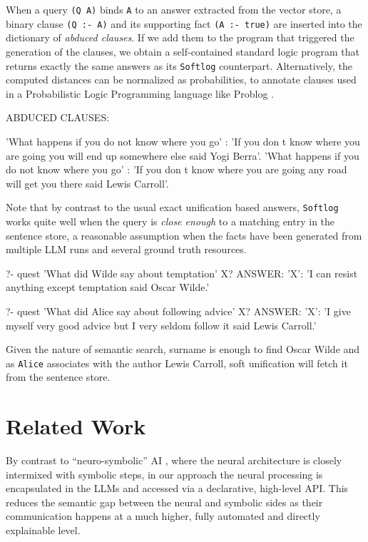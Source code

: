 \documentclass[submission,copyright,creativecommons]{eptcs}
\begin{document}
When a query {\tt (Q A)} binds {\tt A} to an answer extracted from the vector store,
a binary clause {\tt (Q :- A)}  and its supporting fact {\tt (A :- true)} are inserted into the   dictionary of {\em abduced clauses}. If we add them to the program that triggered the generation of the clauses, we obtain a self-contained standard logic program that returns exactly the same answers as its {\tt Softlog} counterpart.
Alternatively, the computed distances  can be normalized as probabilities,  to annotate clauses used in a Probabilistic Logic Programming language like Problog \cite{de2007problog}.
\begin{codex}
ABDUCED CLAUSES:

'What happens if you do not know where you go' : 
    'If you don t know where you are going you will end up somewhere else 
    said Yogi Berra'. %
'What happens if you do not know where you go' : 
    'If you don t know where you are going any road will get you there 
    said Lewis Carroll'. %
\end{codex}
Note that by contrast to the usual exact unification based answers, {\tt Softlog} works quite well when the query is {\em close enough} to a matching entry in the sentence store, a reasonable assumption when the facts have been generated from multiple LLM runs and several ground truth resources.
\begin{codex}
?- quest 'What did Wilde say about temptation' X?
ANSWER: {'X': 'I can resist anything except temptation said Oscar Wilde.'}

?- quest 'What did Alice say about following advice' X?
ANSWER: {'X': 'I give myself very good advice but I very seldom follow it 
               said Lewis Carroll.'}
\end{codex}
Given the nature of semantic search, surname is enough to find Oscar Wilde and as {\tt Alice} associates with the author Lewis Carroll, soft unification will  fetch it from the sentence store.


\section{Related Work}\label{rel}


By contrast to ``neuro-symbolic'' AI \cite{neurosym}, where the neural architecture is closely intermixed with symbolic steps, in our approach the neural processing is encapsulated in the LLMs and accessed via a declarative, high-level API. This reduces the semantic gap between the neural and symbolic sides as their communication happens at a much higher, fully automated and directly explainable level.
\end{document}
